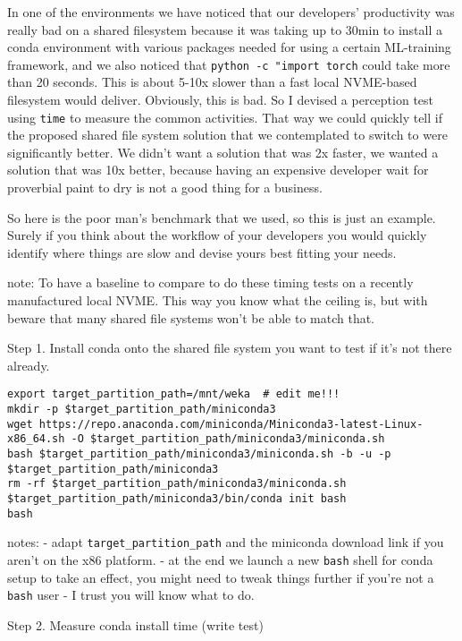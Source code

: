 \documentclass[
]{report}
\begin{document}
In one of the environments we have noticed that our developers'
productivity was really bad on a shared filesystem because it was taking
up to 30min to install a conda environment with various packages needed
for using a certain ML-training framework, and we also noticed that
\texttt{python\ -c\ "import\ torch\textquotesingle{}} could take more
than 20 seconds. This is about 5-10x slower than a fast local NVME-based
filesystem would deliver. Obviously, this is bad. So I devised a
perception test using \texttt{time} to measure the common activities.
That way we could quickly tell if the proposed shared file system
solution that we contemplated to switch to were significantly better. We
didn't want a solution that was 2x faster, we wanted a solution that was
10x better, because having an expensive developer wait for proverbial
paint to dry is not a good thing for a business.

So here is the poor man's benchmark that we used, so this is just an
example. Surely if you think about the workflow of your developers you
would quickly identify where things are slow and devise yours best
fitting your needs.

note: To have a baseline to compare to do these timing tests on a
recently manufactured local NVME. This way you know what the ceiling is,
but with beware that many shared file systems won't be able to match
that.

Step 1. Install conda onto the shared file system you want to test if
it's not there already.

\begin{verbatim}
export target_partition_path=/mnt/weka  # edit me!!!
mkdir -p $target_partition_path/miniconda3
wget https://repo.anaconda.com/miniconda/Miniconda3-latest-Linux-x86_64.sh -O $target_partition_path/miniconda3/miniconda.sh
bash $target_partition_path/miniconda3/miniconda.sh -b -u -p $target_partition_path/miniconda3
rm -rf $target_partition_path/miniconda3/miniconda.sh
$target_partition_path/miniconda3/bin/conda init bash
bash
\end{verbatim}

notes: - adapt \texttt{target\_partition\_path} and the miniconda
download link if you aren't on the x86 platform. - at the end we launch
a new \texttt{bash} shell for conda setup to take an effect, you might
need to tweak things further if you're not a \texttt{bash} user - I
trust you will know what to do.

Step 2. Measure conda install time (write test)
\end{document}
